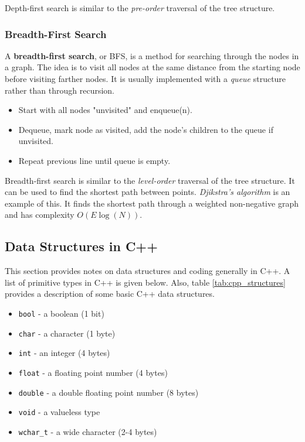 Depth-first search is similar to the \textit{pre-order} traversal of the tree structure. 

\subsubsection{Breadth-First Search}

A \textbf{breadth-first search}, or BFS, is a method for searching through the nodes in a graph. The idea is to visit all nodes at the same distance from the starting node before visiting farther nodes. It is usually implemented with a \textit{queue} structure rather than through recursion. 

\begin{itemize}
	\item Start with all nodes "unvisited" and enqueue(n). 
	\item Dequeue, mark node as visited, add the node's children to the queue if unvisited. 
	\item Repeat previous line until queue is empty. 
\end{itemize}

Breadth-first search is similar to the \textit{level-order} traversal of the tree structure. It can be used to find the shortest path between points. \textit{Djikstra's algorithm} is an example of this. It finds the shortest path through a weighted non-negative graph and has complexity $O(E \log(N))$.

\subsection{Data Structures in C++}

This section provides notes on data structures and coding generally in C++. A list of primitive types in C++ is given below. Also, table \ref{tab:cpp_structures} provides a description of some basic C++ data structures. 

\begin{itemize}
	\item \texttt{bool} - a boolean (1 bit)
	\item \texttt{char} - a character (1 byte)
	\item \texttt{int} - an integer (4 bytes)
	\item \texttt{float} - a floating point number (4 bytes)
	\item \texttt{double} - a double floating point number (8 bytes)
	\item \texttt{void} - a valueless type
	\item \texttt{wchar\_t} - a wide character (2-4 bytes)
\end{itemize}

